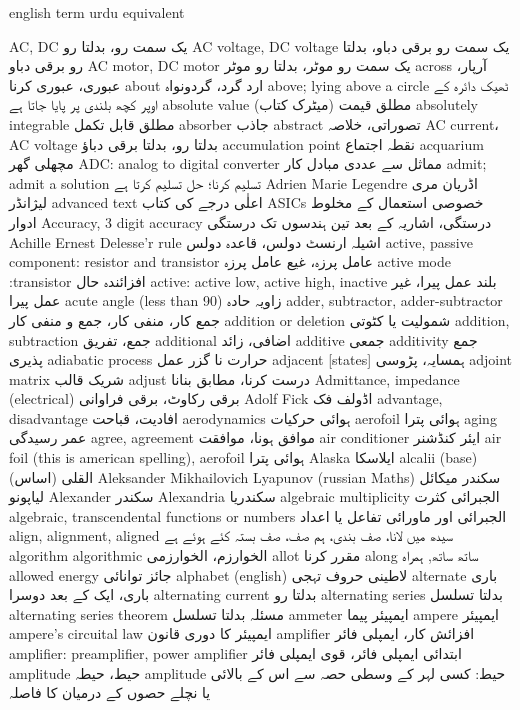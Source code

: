 english term	urdu equivalent
	
AC, DC	یک سمت رو، بدلتا رو
AC voltage, DC voltage	یک سمت رو برقی دباو، بدلتا رو برقی دباو
AC motor, DC motor	یک سمت رو موٹر، بدلتا رو موٹر
across	آرپار، عبوری، عبوری کرنا
about	ارد گرد، گردونواہ
above; lying above a circle	ٹھیک دائرہ کے اوپر کچھ بلندی پر پایا جاتا ہے
absolute value	مطلق قیمت (میٹرک کتاب)
absolutely integrable	مطلق قابل تکمل
absorber	جاذب
abstract	تصوراتی، خلاصہ
AC current، AC voltage	بدلتا رو، بدلتا برقی دباؤ
accumulation point	نقطہ اجتماع
acquarium	مچھلی گھر
ADC: analog to digital converter	مماثل سے عددی مبادل کار
admit; admit a solution	تسلیم کرنا؛ حل تسلیم کرتا ہے
Adrien Marie Legendre	اڈریان مری لیژانڈر
advanced text	اعلٰی درجے کی کتاب
ASICs	خصوصی استعمال کے مخلوط ادوار
Accuracy, 3 digit accuracy	درستگی، اشاریہ کے بعد تین ہندسوں تک درستگی
Achille Ernest Delesse’r rule	اشیلہ ارنسٹ دولس، قاعدہ دولس
active, passive component: resistor and transistor	عامل پرزہ، غیع عامل پرزہ
active mode :transistor	افزائندہ حال
active: active low, active high, inactive	بلند عمل پیرا، غیر عمل پیرا
acute angle (less than 90)	زاویہ حادہ
adder, subtractor, adder-subtractor	جمع کار، منفی کار، جمع و منفی کار
addition or deletion	شمولیت یا کٹوتی
addition, subtraction	جمع، تفریق
additional	اضافی، زائد
additive	جمعی
additivity	جمع پذیری
adiabatic process	حرارت نا گزر عمل
adjacent [states]	ہمسایہ، پڑوسی
adjoint matrix	شریک قالب
adjust	درست کرنا، مطابق بنانا
Admittance, impedance (electrical)	برقی رکاوٹ، برقی فراوانی
Adolf Fick	اڈولف فک
advantage, disadvantage	افادیت، قباحت
aerodynamics	ہوائی حرکیات
aerofoil	ہوائی پترا
aging	عمر رسیدگی
agree, agreement	موافق ہونا، موافقت
air conditioner	ایئر کنڈشنر
air foil (this is american spelling), aerofoil	ہوائی پترا
Alaska	ایلاسکا
alcalii (base)	القلی (اساس)
Aleksander Mikhailovich Lyapunov (russian Maths)	سکندر میکائل لیاپونو
Alexander	سکندر
Alexandria	سکندریا
algebraic multiplicity	الجبرائی کثرت
algebraic, transcendental functions or numbers	الجبرائی اور ماورائی تفاعل یا اعداد
align, alignment, aligned	سیدھ میں لانا، صف بندی، ہم صف، صف بستہ کئے ہوئے ہے
algorithm algorithmic	الخوارزم، الخوارزمی
allot	مقرر کرنا
along	ساتھ ساتھ, ہمراہ
allowed energy	جائز توانائی
alphabet (english)	لاطینی حروف تہجی
alternate	باری باری، ایک کے بعد دوسرا
alternating current	بدلتا رو
alternating series	بدلتا تسلسل
alternating series theorem	مسئلہ بدلتا تسلسل
ammeter	ایمپیئر پیما
ampere	ایمپیئر
ampere's circuital law	ایمپیئر کا دوری قانون
amplifier	افزائش کار، ایمپلی فائر
amplifier: preamplifier, power amplifier	ابتدائی ایمپلی فائر، قوی ایمپلی فائر
amplitude	حیط، حیطہ
amplitude	حیط: کسی لہر کے وسطی حصہ سے اس کے بالائی یا نچلے حصوں کے درمیان کا فاصلہ

